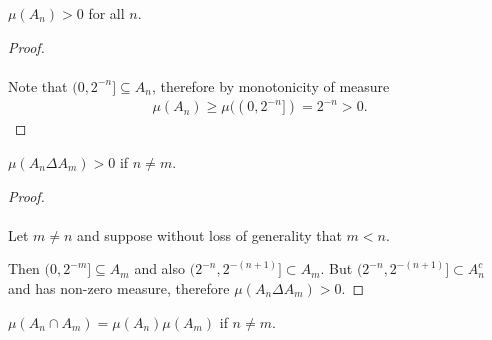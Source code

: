 \begin{claim*}
  $\mu(A_n) > 0$ for all $n$.
\end{claim*}

\begin{proof}~\\~\\
  Note that $(0, 2^{-n}] \subseteq A_n$, therefore by monotonicity of measure
  \begin{align*}
    \mu(A_n) \geq \mu((0, 2^{-n}]) = 2^{-n} > 0.
  \end{align*}
\end{proof}

\begin{claim*}
  $\mu(A_n \Delta A_m) > 0$ if $n \neq m$.
\end{claim*}

\begin{proof}~\\~\\
  Let $m \neq n$ and suppose without loss of generality that $m < n$.

  Then $(0, 2^{-m}] \subseteq A_m$ and also $(2^{-n}, 2^{-(n+1)}] \subset A_m$.
  But $(2^{-n}, 2^{-(n+1)}] \subset A_n^c$ and has non-zero measure, therefore $\mu(A_n \Delta A_m) > 0$.
\end{proof}

\begin{claim*}
  $\mu(A_n \cap A_m) = \mu(A_n)\mu(A_m)$ if $n \neq m$.
\end{claim*}

